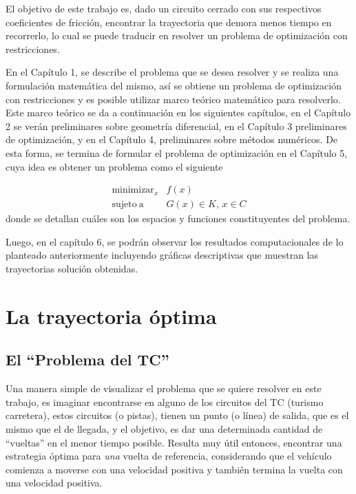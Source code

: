 \documentclass[a4paper,10pt]{book}
\begin{document}
El objetivo de este trabajo es, dado un circuito cerrado con sus respectivos coeficientes de fricción, encontrar la trayectoria que demora menos tiempo en recorrerlo, lo cual se puede traducir en resolver un problema de optimización con restricciones.

En el Capítulo 1, se describe el problema que se desea resolver y se realiza una formulación matemática del mismo, así se obtiene un problema de optimización con restricciones y es posible utilizar marco teórico matemático para resolverlo. Este marco teórico se da a continuación en los siguientes capítulos, en el Capítulo 2 se verán preliminares sobre geometría diferencial, en el Capítulo 3 preliminares de optimización, y en el Capítulo 4, preliminares sobre métodos numéricos. De esta forma, se termina de formular el problema de optimización en el Capítulo 5, cuya idea es obtener un problema como el siguiente

\begin{equation*}
\begin{array}{rl}
\displaystyle \mathop{\mathrm{minimizar}}_{x} & \displaystyle f(x) \\
\mathrm{sujeto \ a} & G(x)\in K,\, x\in C
\end{array}
\end{equation*}
donde se detallan cuáles son los espacios y funciones constituyentes del problema.

Luego, en el capítulo 6, se podrán observar los resultados computacionales de lo planteado anteriormente incluyendo gráficas descriptivas que muestran las trayectorias solución obtenidas.



\chapter{La trayectoria óptima}

\section{El ``Problema del TC''}
Una manera simple de visualizar el problema que se quiere resolver en este trabajo, es  imaginar encontrarse en alguno de los circuitos del TC (turismo carretera), estos circuitos (o pistas), tienen un punto (o línea) de salida, que es el mismo que el de llegada, y el objetivo, es dar una determinada cantidad de ``vueltas'' en el menor tiempo posible. Resulta muy útil entonces, encontrar una estrategia óptima para \emph{una} vuelta de referencia, considerando que el vehículo comienza a moverse con una velocidad positiva y también termina la vuelta con una velocidad positiva.
\end{document}
